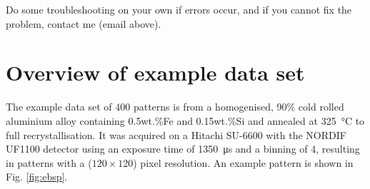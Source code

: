\documentclass[11pt, twoside]{article}
\begin{document}
Do some troubleshooting on your own if errors occur, and if you cannot fix the problem, contact me (email above).


\section{Overview of example data set}

The example data set of 400 patterns is from a homogenised, 90\% cold rolled aluminium alloy containing 0.5wt.\%Fe and 0.15wt.\%Si and annealed at \SI{325}{\celsius} to full recrystallisation. It was acquired on a Hitachi SU-6600 with the NORDIF UF1100 detector using an exposure time of \SI{1350}{\micro\second} and a binning of 4, resulting in patterns with a ($120 \times 120$) pixel resolution. An example pattern is shown in Fig. \ref{fig:ebsp}.
\end{document}
